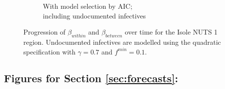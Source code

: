 \documentclass[12pt]{article}
\begin{document}
\begin{appendices}
\begin{figure}[H]
\begin{subfigure}{\textwidth}
    	      \caption{With model selection by AIC; \\ including undocumented infectives}
    	      \label{fig:beta_between_over_time_isole_aic_undoc}
    	    \end{subfigure}
    	    \caption{Progression of $\beta_{within}$ and $\beta_{between}$ over time for the Isole NUTS 1 region. Undocumented infectives are modelled using the quadratic specification with $\gamma = 0.7$ and $f^{min}=0.1$.}
    	    \label{fig:beta_between_over_time_isole}
        \end{figure}
		
		\subsection{Figures for Section \ref{sec:forecasts}: } \label{sapp:figures_forecasts}
		

\end{appendices}
\end{document}
